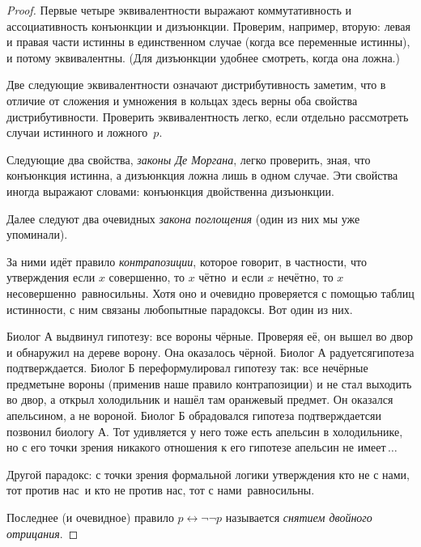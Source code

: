 \begin{proof}
Первые четыре эквивалентности выражают коммутативность и
ассоциативность конъюнкции и дизъюнкции. Проверим, например,
вторую: левая и правая части истинны в единственном случае
(когда все переменные истинны), и потому эквивалентны. (Для
дизъюнкции удобнее смотреть, когда она ложна.)

Две следующие эквивалентности означают  дистрибутивность\т
заметим, что в отличие от сложения и умножения в кольцах здесь
верны оба свойства дистрибутивности. Проверить эквивалентность
легко, если отдельно рассмотреть случаи истинного и ложного~$p$.

Следующие два свойства, \emph{законы Де Моргана},%
%
легко проверить, зная, что конъюнкция истинна, а дизъюнкция
ложна лишь в одном случае. Эти свойства иногда выражают
словами:  конъюнкция двойственна дизъюнкции.

Далее следуют два очевидных \emph{закона поглощения}%
(один из них мы уже упоминали).

За ними идёт правило \emph{контрапозиции},%
%
которое говорит, в
частности, что утверждения  если $x$ совершенно, то $x$
чётно\ и  если $x$ нечётно, то $x$ несовершенно\
равносильны. Хотя оно и очевидно проверяется с помощью таблиц
истинности, с ним связаны любопытные парадоксы. Вот один из них.

Биолог А выдвинул гипотезу: все вороны чёрные. Проверяя её, он
вышел во двор и обнаружил на дереве ворону. Она оказалось
чёрной. Биолог А радуется\т гипотеза подтверждается. Биолог Б
переформулировал гипотезу так: все не\д чёрные предметы\т не
вороны (применив наше правило контрапозиции) и не стал выходить
во двор, а открыл холодильник и нашёл там оранжевый предмет. Он
оказался апельсином, а не вороной. Биолог Б обрадовался\т
гипотеза подтверждается\т и позвонил биологу А. Тот удивляется\т
у него тоже есть апельсин в холодильнике, но с его точки зрения
никакого отношения к его гипотезе апельсин не имеет\,$\dots$

Другой парадокс: с точки зрения формальной логики утверждения
 кто не с нами, тот против нас\ и \лк кто не против нас,
тот с нами\пк\ равносильны.

Последнее (и очевидное) правило $p\leftrightarrow \lnot\lnot p$
называется \emph{снятием двойного отрицания}.%
\end{proof}

